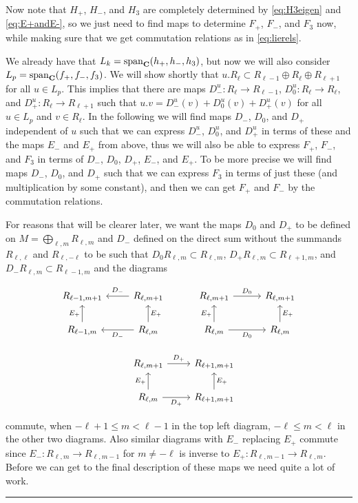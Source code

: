 Now note that $H_+$, $H_-$, and $H_3$ are completely determined by \cref{eq:H3eigen} and \cref{eq:E+andE-}, so we just need to find maps to determine $F_+$, $F_-$, and $F_3$ now, while making sure that we get commutation relations as in \cref{eq:lierels}.

We already have that $L_k=\operatorname{span}_{\mathbf{C}}(h_+,h_-,h_3)$, but now we will also consider $L_p=\operatorname{span}_{\mathbf{C}}(f_+,f_-,f_3)$. We will show shortly that $u.R_\ell \subset R_{\ell-1}\oplus R_\ell \oplus R_{\ell+1}$ for all $u\in L_p$. This implies that there are maps $D_-^{u}\colon R_\ell\to R_{\ell-1}$, $D_0^{u}\colon R_\ell\to R_\ell$, and $D_+^{u}\colon R_\ell\to R_{\ell+1}$ such that $u.v=D_-^{u}(v)+D_0^{u}(v)+D_+^{u}(v)$ for all $u\in L_p$ and $v\in R_\ell$. In the following we will find maps $D_-$, $D_0$, and $D_+$ independent of $u$ such that we can express $D_-^{u}$, $D_0^{u}$, and $D_+^{u}$ in terms of these and the maps $E_-$ and $E_+$ from above, thus we will also be able to express $F_+$, $F_-$, and $F_3$ in terms of $D_-$, $D_0$, $D_+$, $E_-$, and $E_+$. To be more precise we will find maps $D_-$, $D_0$, and $D_+$ such that we can express $F_3$ in terms of just these (and multiplication by some constant), and then we can get $F_+$ and $F_-$ by the commutation relations. 

For reasons that will be clearer later, we want the maps $D_0$ and $D_+$ to be defined on $M=\bigoplus_{\ell,m} R_{\ell,m}$ and $D_-$ defined on the direct sum without the summands $R_{\ell,\ell}$ and $R_{\ell,-\ell}$ to be such that $D_0 R_{\ell,m}\subset R_{\ell,m}$, $D_+ R_{\ell,m} \subset R_{\ell+1,m}$, and $D_- R_{\ell,m} \subset R_{\ell-1,m}$ and the diagrams
\begin{center}
  \begin{equation}\label{eq:Ddiagrams}
    \begin{tikzcd}[baseline=(current bounding box.center)]
      R_{\ell-1,m+1} & R_{\ell,m+1} \ar[l,"D_-",swap] & R_{\ell,m+1} \ar[r,"D_0"] & R_{\ell,m+1}  \\
      R_{\ell-1,m} \ar[u,"E_+"] & R_{\ell,m} \ar[l,"D_-"] \ar[u,"E_+",swap] & R_{\ell,m} \ar[r,"D_0",swap] \ar[u,"E_+"] & R_{\ell,m} \ar[u,"E_+",swap] \\
      & R_{\ell,m+1} \ar[r,"D_+"] & R_{\ell+1,m+1} \\
      & R_{\ell,m} \ar[u,"E_+"] \ar[r,"D_+",swap] & R_{\ell+1,m+1} \ar[u,"E_+",swap]
    \end{tikzcd}
  \end{equation}
\end{center}
commute, when $-\ell+1\leq m < \ell-1$ in the top left diagram, $-\ell\leq m<\ell$ in the other two diagrams. Also similar diagrams with $E_-$ replacing $E_+$ commute since $E_-\colon R_{\ell,m}\to R_{\ell,m-1}$ for $m\neq -\ell$ is inverse to $E_+\colon R_{\ell,m-1}\to R_{\ell,m}$. Before we can get to the final description of these maps we need quite a lot of work.\fancybreak{* \quad * \quad * \quad * \quad *}

